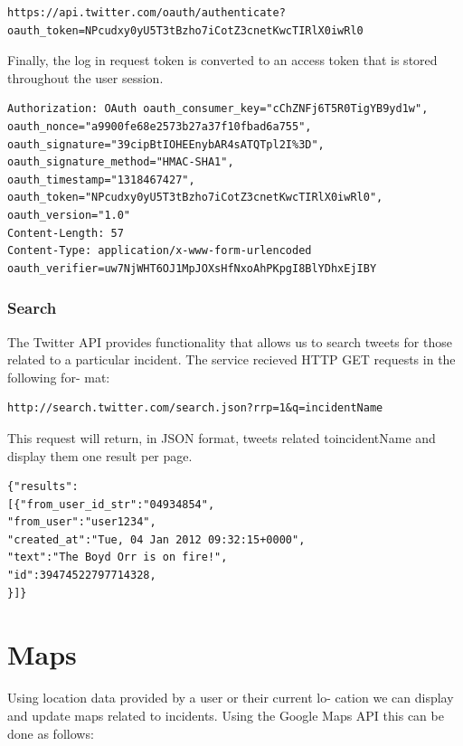 \documentclass{sig-alt-release2}
\begin{document}
\tiny
\begin{verbatim}
https://api.twitter.com/oauth/authenticate?oauth_token=NPcudxy0yU5T3tBzho7iCotZ3cnetKwcTIRlX0iwRl0
\end{verbatim}
\normalsize

Finally, the log in request token is converted to an access
token that is stored throughout the user session.

\tiny
\begin{verbatim}
Authorization: OAuth oauth_consumer_key="cChZNFj6T5R0TigYB9yd1w",
oauth_nonce="a9900fe68e2573b27a37f10fbad6a755",
oauth_signature="39cipBtIOHEEnybAR4sATQTpl2I%3D",
oauth_signature_method="HMAC-SHA1",
oauth_timestamp="1318467427",
oauth_token="NPcudxy0yU5T3tBzho7iCotZ3cnetKwcTIRlX0iwRl0",
oauth_version="1.0"
Content-Length: 57
Content-Type: application/x-www-form-urlencoded
oauth_verifier=uw7NjWHT6OJ1MpJOXsHfNxoAhPKpgI8BlYDhxEjIBY
\end{verbatim}
\normalsize

\subsubsection{Search}

The Twitter API provides functionality that allows us to
search tweets for those related to a particular incident. The
service recieved HTTP GET requests in the following for-
mat:

\small
\begin{verbatim}
http://search.twitter.com/search.json?rrp=1&q=incidentName
\end{verbatim}
\normalsize

This request will return, in JSON format, tweets related
toincidentName and display them one result per page.

\begin{verbatim}
{"results":
[{"from_user_id_str":"04934854",
"from_user":"user1234",
"created_at":"Tue, 04 Jan 2012 09:32:15+0000",
"text":"The Boyd Orr is on fire!",
"id":39474522797714328,
}]}
\end{verbatim}

\section{Maps}

Using location data provided by a user or their current lo-
cation we can display and update maps related to incidents.
Using the Google Maps API this can be done as follows:
\end{document}
